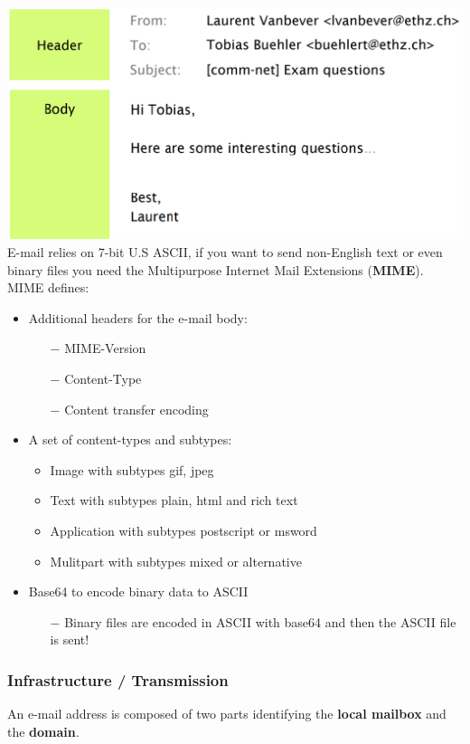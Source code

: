 \documentclass[a4paper, fontsize=8pt, landscape, DIV=1]{scrartcl}
\begin{document}
\begin{multicols*}{4}
		\includegraphics[width=\columnwidth]{images/Application_Layer/email_content.png}
		E-mail relies on 7-bit U.S ASCII, if you want to send non-English text or even
		binary files you need the Multipurpose Internet Mail Extensions (\textbf{MIME}).
		MIME defines: 
		\begin{itemize}[noitemsep]
			\item Additional headers for the e-mail body:
			\begin{itemize}
				\item[$-$] MIME-Version
				\item[$-$] Content-Type
				\item[$-$] Content transfer encoding
			\end{itemize}
			\item A set of content-types and subtypes:
			\begin{itemize}
				\item Image with subtypes gif, jpeg
				\item Text with subtypes plain, html and rich text
				\item Application with subtypes postscript or msword
				\item Mulitpart with subtypes mixed or alternative
			\end{itemize}
			\item Base64 to encode binary data to ASCII
			\begin{itemize}
				\item[$-$] Binary files are encoded in ASCII with base64 and then the ASCII
				file is sent!
			\end{itemize}
		\end{itemize}
		
		\subsubsection{Infrastructure / Transmission}
		An e-mail address is composed  of two parts identifying the \textbf{local
			mailbox} and the \textbf{domain}.\\
		

\end{multicols*}
\end{document}
